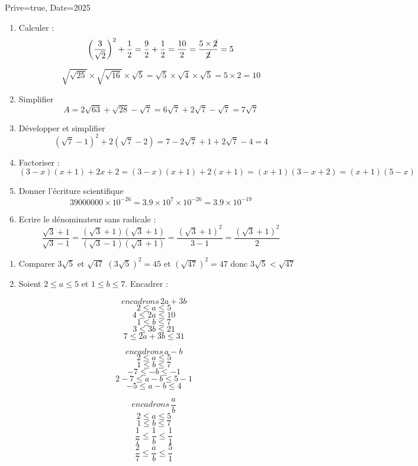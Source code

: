 \documentclass[a4paper,12pt]{article}
\begin{document}
\begin{Maquette}[Exam]{Prive=true, Date=2025}

\begin{exercice}[BaremeDetaille]
\begin{enumerate}
\item{} Calculer :
$$\left(\dfrac{3}{\sqrt{2}}\right)^{2}+\dfrac{1}{2}=\dfrac{9}{2}+\dfrac{1}{2}=\dfrac{10}{2}=\dfrac{5\times \cancel{2}}{\cancel{2}}=5$$

$$\sqrt{\sqrt{25}}\times \sqrt{\sqrt{16}}\times\sqrt{5}=\sqrt{5}\times\sqrt{4}\times\sqrt{5}=5\times 2=10$$
\item{} Simplifier 
$$A=2\sqrt{63}+\sqrt{28}-\sqrt{7}=6\sqrt{7}+2\sqrt{7}-\sqrt{7}=7\sqrt{7}$$
\item{} Développer et simplifier
 $$\left(\sqrt{7}-1\right)^{2}+2(\sqrt{7}-2)=7-2\sqrt{7}+1+2\sqrt{7}
 -4=4$$
 \item{} Factoriser :
$$(3-x)(x+1)+2x+2=(3-x)(x+1)+2(x+1)=(x+1)(3-x+2)=(x+1)(5-x)$$
\item{}Donner l'écriture scientifique
$$39000000\times 10^{-26}=3.9\times 10^{7}\times 10^{-26}=3.9\times 10^{-19}$$
\item{} Ecrire le dénominateur sans radicale :
$$\dfrac{\sqrt{3}+1}{\sqrt{3}-1}=\dfrac{(\sqrt{3}+1)(\sqrt{3}+1)}{(\sqrt{3}-1)(\sqrt{3}+1)}=\dfrac{(\sqrt{3}+1)^{2}}{3-1}=\dfrac{(\sqrt{3}+1)^{2}}{2}$$
\end{enumerate}	
\end{exercice}

\begin{exercice}[BaremeDetaille]
\begin{enumerate}
\item{} Comparer $3\sqrt{5}$ et $\sqrt{47}$\newline
$(3\sqrt{5})^{2}=45$ et $(\sqrt{47})^{2}=47$ donc $3\sqrt{5}< \sqrt{47}$
\item{} Soient $2\leq a\leq 5$ et $1\leq b\leq 7$. Encadrer :
\end{enumerate}
\begin{minipage}{.3\linewidth}
$$encadrons \,2a+3b$$
$$2\leq a\leq 5$$
$$4\leq 2a\leq 10$$
$$1\leq b\leq 7$$
$$3\leq 3b\leq 21$$
$$7\leq 2a+3b\leq 31$$
\end{minipage}\hfill\vrule\hfill%
\begin{minipage}{.3\linewidth}
$$encadrons\, a-b$$
$$2\leq a\leq 5$$
$$1\leq b\leq 7$$
$$-7\leq -b\leq -1$$
$$2-7\leq a-b\leq 5-1$$
$$-5\leq a-b\leq 4$$
\end{minipage}\hfill\vrule\hfill%
\begin{minipage}{.3\linewidth}
$$encadrons\, \dfrac{a}{b}$$
$$2\leq a\leq 5$$
$$1\leq b\leq 7$$
$$\dfrac{1}{7}\leq \dfrac{1}{b}\leq \dfrac{1}{1}$$
$$\dfrac{2}{7}\leq \dfrac{a}{b}\leq \dfrac{5}{1}$$
\end{minipage}
\end{exercice}


\end{Maquette}
\end{document}

